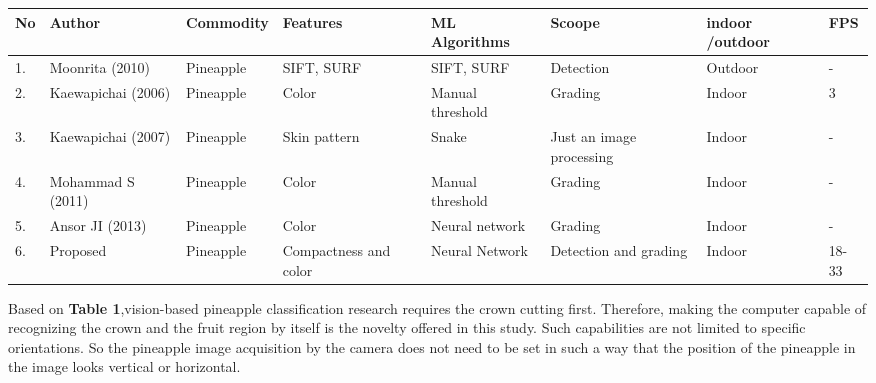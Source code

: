 \documentclass[11pt]{article}
\begin{document}
\begin{linenumbers}
\begin{tabular}{ p{0.2cm} p{1.7cm} p{1.5cm} p{1.8cm} p{2.8cm} p{2.5cm} p{1.6cm} p{0.5cm}}
	\hline
	No & Author & Commodity & Features & ML Algorithms & Scoope & indoor /outdoor & FPS\\
	\hline
	1. & Moonrita (2010)    & Pineapple & SIFT, SURF         & SIFT, SURF       & Detection               & Outdoor & -\\ 
	2. & Kaewapichai (2006) & Pineapple & Color              & Manual threshold & Grading                 & Indoor  & 3\\
	3. & Kaewapichai (2007) & Pineapple & Skin pattern       & Snake            & Just an image processing& Indoor  & -\\
	4. & Mohammad S (2011)  & Pineapple & Color              & Manual threshold & Grading                 & Indoor  & -\\
	5. & Ansor JI (2013)    & Pineapple & Color              & Neural network   & Grading                 & Indoor  & -\\
	6. & Proposed           & Pineapple & Compactness and color & Neural Network& Detection and grading   & Indoor  & 18-33\\
	\hline
\end{tabular}

Based on \textbf {Table 1},vision-based pineapple classification research requires the crown cutting first. Therefore, making the computer capable of recognizing the crown and the fruit region by itself is the novelty offered in this study. Such capabilities are not limited to specific orientations. So the pineapple image acquisition by the camera does not need to be set in such a way that the position of the pineapple in the image looks vertical or horizontal.


\end{linenumbers}
\end{document}

